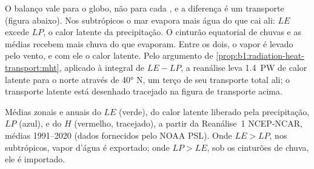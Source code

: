 O balanço vale para o globo, não para cada , e a diferença é um transporte (figura abaixo).
Nos subtrópicos o mar evapora mais água do que cai ali: $LE$ excede $LP$, o calor latente da
precipitação. O cinturão equatorial de chuvas e as  médias recebem mais chuva do que
evaporam. Entre os dois, o vapor é levado pelo vento, e com ele o calor latente. Pelo argumento de
\cref{prop:b1:radiation-heat-transport:mht}, aplicado à integral de $LE - LP$, a reanálise leva
\qty{1.4}{PW} de calor latente para o norte através de \ang{40} N, um terço de seu transporte total
ali; o transporte latente está desenhado tracejado na figura de transporte acima.

\begin{omfigure}

{\small Médias zonais e anuais do  $LE$ (verde), do calor latente liberado
pela precipitação, $LP$ (azul), e do  $H$ (vermelho, tracejado), a partir da
Reanálise~1 NCEP-NCAR, médias 1991--2020 (dados fornecidos pelo NOAA PSL). Onde $LE > LP$, nos
subtrópicos, vapor d'água é exportado; onde $LP > LE$, sob os cinturões de chuva, ele é importado.}
\label{fig:b1:radiation-heat-transport:surface}
\end{omfigure}

